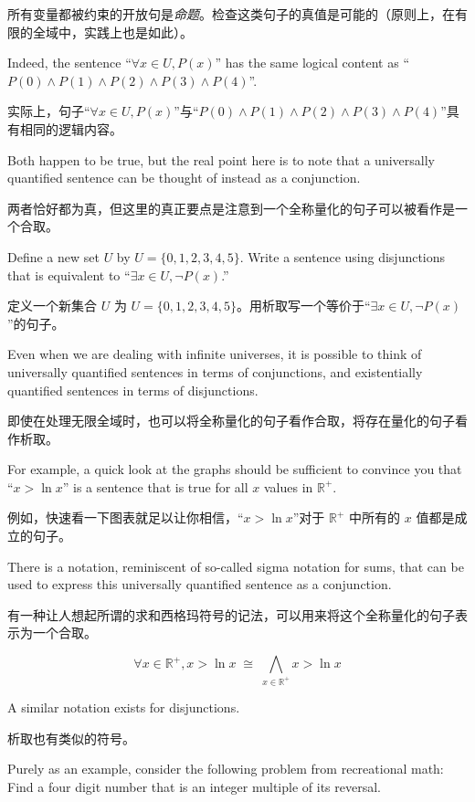所有变量都被约束的开放句是{\em 命题}。检查这类句子的真值是可能的（原则上，在有限的全域中，实践上也是如此）。

Indeed, the sentence ``$\forall x \in U, P(x)$'' has the same logical content
as ``$P(0) \land P(1) \land P(2) \land P(3)  \land P(4)$''.

实际上，句子“$\forall x \in U, P(x)$”与“$P(0) \land P(1) \land P(2) \land P(3)  \land P(4)$”具有相同的逻辑内容。

Both happen to be
true, but the real point here is to note that a universally quantified sentence
can be thought of instead as a conjunction.

两者恰好都为真，但这里的真正要点是注意到一个全称量化的句子可以被看作是一个合取。

\begin{exer}
Define a new set $U$ by $U=\{0,1,2,3,4,5\}$.  
Write a sentence using disjunctions
that is equivalent to ``$\exists x \in U, {\lnot}P(x)$.''

定义一个新集合 $U$ 为 $U=\{0,1,2,3,4,5\}$。用析取写一个等价于“$\exists x \in U, {\lnot}P(x)$”的句子。
\end{exer}

Even when we are dealing with infinite universes, it is possible to
think of universally quantified sentences in terms of conjunctions,
and existentially quantified sentences in terms of disjunctions.

即使在处理无限全域时，也可以将全称量化的句子看作合取，将存在量化的句子看作析取。

For
example, a quick look at the graphs should be sufficient to convince you
that ``$ x > \ln x $'' is a sentence that is true for all $x$ values in
${\mathbb R}^+$.

例如，快速看一下图表就足以让你相信，“$ x > \ln x $”对于 ${\mathbb R}^+$ 中所有的 $x$ 值都是成立的句子。

There is a notation, reminiscent of so-called sigma notation
for sums, that can be used to express this universally quantified sentence as
a conjunction.

有一种让人想起所谓的求和西格玛符号的记法，可以用来将这个全称量化的句子表示为一个合取。

\[
\forall x \in {\mathbb R}^+, x > \ln x \; \cong \; \bigwedge_{x \in {\mathbb R}^+} x > \ln x
\]

A similar notation exists for disjunctions.

析取也有类似的符号。

Purely as an example, consider
the following problem from recreational math: Find a four digit number that
is an integer multiple of its reversal.

